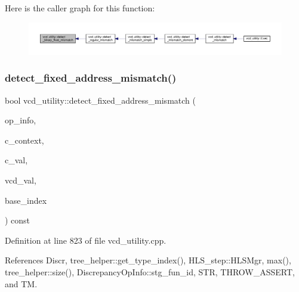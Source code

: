 Here is the caller graph for this function\+:
\nopagebreak
\begin{figure}[H]
\begin{center}
\leavevmode
\includegraphics[width=350pt]{d8/d51/classvcd__utility_af72ee3efc398a2cded1b268c1eaf92cd_icgraph}
\end{center}
\end{figure}
\mbox{\label{classvcd__utility_adcea7de16b7dbf1c8b74aef06fc959a5}} 
\subsubsection{\texorpdfstring{detect\+\_\+fixed\+\_\+address\+\_\+mismatch()}{detect\_fixed\_address\_mismatch()}}
{\footnotesize\ttfamily bool vcd\+\_\+utility\+::detect\+\_\+fixed\+\_\+address\+\_\+mismatch (\begin{DoxyParamCaption}\item[{const \hyperlink{classDiscrepancyOpInfo}{Discrepancy\+Op\+Info} \&}]{op\+\_\+info,  }\item[{const uint64\+\_\+t}]{c\+\_\+context,  }\item[{const std\+::string \&}]{c\+\_\+val,  }\item[{const std\+::string \&}]{vcd\+\_\+val,  }\item[{const unsigned int}]{base\+\_\+index }\end{DoxyParamCaption}) const\hspace{0.3cm}{\ttfamily [protected]}}



Definition at line 823 of file vcd\+\_\+utility.\+cpp.



References Discr, tree\+\_\+helper\+::get\+\_\+type\+\_\+index(), H\+L\+S\+\_\+step\+::\+H\+L\+S\+Mgr, max(), tree\+\_\+helper\+::size(), Discrepancy\+Op\+Info\+::stg\+\_\+fun\+\_\+id, S\+TR, T\+H\+R\+O\+W\+\_\+\+A\+S\+S\+E\+RT, and TM.



